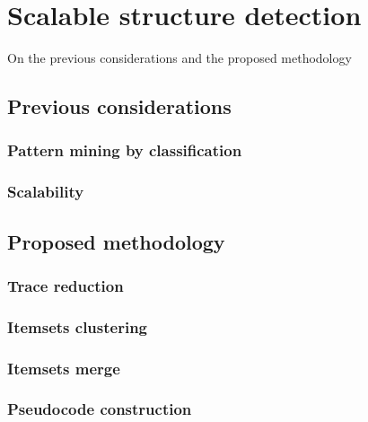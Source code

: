 
\chapter{Scalable structure detection}

On the previous considerations and the proposed methodology

\section{Previous considerations}

\subsection{Pattern mining by classification}
\subsection{Scalability}

\section{Proposed methodology}

\subsection{Trace reduction}

\subsection{Itemsets clustering}

\subsection{Itemsets merge}

\subsection{Pseudocode construction}
